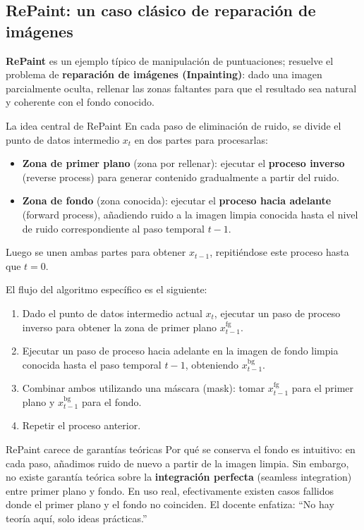\documentclass[a4paper]{article}
\begin{document}
\subsection{RePaint: un caso clásico de reparación de imágenes}

\textbf{RePaint} es un ejemplo típico de manipulación de puntuaciones; resuelve el problema de \textbf{reparación de imágenes (Inpainting)}: dado una imagen parcialmente oculta, rellenar las zonas faltantes para que el resultado sea natural y coherente con el fondo conocido.

\begin{importantbox}{La idea central de RePaint}
En cada paso de eliminación de ruido, se divide el punto de datos intermedio $x_t$ en dos partes para procesarlas:
\begin{itemize}
    \item \textbf{Zona de primer plano} (zona por rellenar): ejecutar el \textbf{proceso inverso} (reverse process) para generar contenido gradualmente a partir del ruido.
    \item \textbf{Zona de fondo} (zona conocida): ejecutar el \textbf{proceso hacia adelante} (forward process), añadiendo ruido a la imagen limpia conocida hasta el nivel de ruido correspondiente al paso temporal $t-1$.
\end{itemize}
Luego se unen ambas partes para obtener $x_{t-1}$, repitiéndose este proceso hasta que $t=0$.
\end{importantbox}

El flujo del algoritmo específico es el siguiente:
\begin{enumerate}
    \item Dado el punto de datos intermedio actual $x_t$, ejecutar un paso de proceso inverso para obtener la zona de primer plano $x_{t-1}^{\text{fg}}$.
    \item Ejecutar un paso de proceso hacia adelante en la imagen de fondo limpia conocida hasta el paso temporal $t-1$, obteniendo $x_{t-1}^{\text{bg}}$.
    \item Combinar ambos utilizando una máscara (mask): tomar $x_{t-1}^{\text{fg}}$ para el primer plano y $x_{t-1}^{\text{bg}}$ para el fondo.
    \item Repetir el proceso anterior.
\end{enumerate}

\begin{warningbox}{RePaint carece de garantías teóricas}
Por qué se conserva el fondo es intuitivo: en cada paso, añadimos ruido de nuevo a partir de la imagen limpia. Sin embargo, no existe garantía teórica sobre la \textbf{integración perfecta} (seamless integration) entre primer plano y fondo. En uso real, efectivamente existen casos fallidos donde el primer plano y el fondo no coinciden. El docente enfatiza: ``No hay teoría aquí, solo ideas prácticas.''
\end{warningbox}
\end{document}
